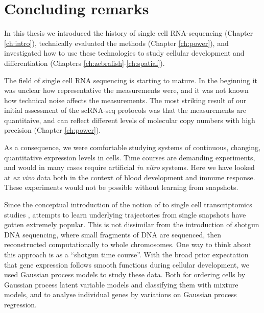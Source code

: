 
\chapter{Concluding remarks}

In this thesis we introduced the history of single cell RNA-sequencing (Chapter \ref{ch:intro}), technically evaluated the methods (Chapter \ref{ch:power}), and investigated how to use these technologies to study cellular development and differentiation (Chapters \ref{ch:zebrafish}-\ref{ch:spatial}).

The field of single cell RNA sequencing is starting to mature. In the beginning it was unclear how representative the measurements were, and it was not known how technical noise affects the measurements. The most striking result of our initial assessment of the scRNA-seq protocols was that the measurements are quantitaive, and can reflect different levels of molecular copy numbers with high precision (Chapter \ref{ch:power}).

As a consequence, we were comfortable studying systems of continuous, changing, quantitative expression levels in cells. Time courses are demanding experiments, and would in many cases require artificial \textit{in vitro} systems. Here we have looked at \textit{ex vivo} data both in the context of blood development and immune response. These experiments would not be possible without learning from snapshots.

Since the conceptual introduction of the notion of  to single cell transcriptomics studies \cite{Trapnell2014-cn}, attempts to learn underlying trajectories from single snapshots have gotten extremely popular. This is not dissimilar from the introduction of shotgun DNA sequencing, where small fragments of DNA are sequenced, then reconstructed computationally to whole chromosomes. One way to think about this approach is as a ``shotgun time course''. With the broad prior expectation that gene expression follows smooth functions during cellular development, we used Gaussian process models to study these data. Both for ordering cells by Gaussian process latent variable models and classifying them with mixture models, and to analyse individual genes by variations on Gaussian process regression.

